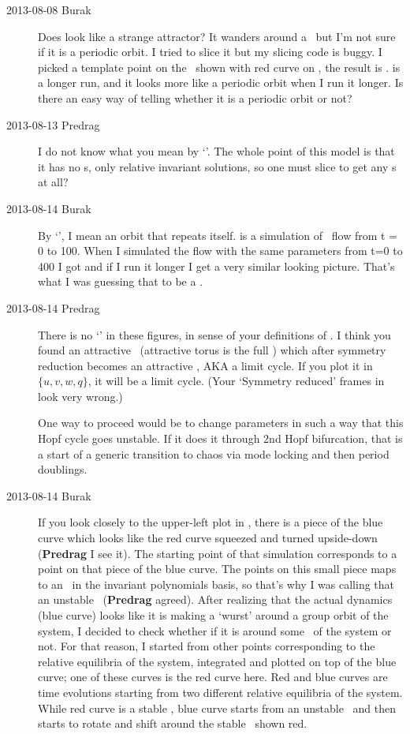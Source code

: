 \begin{description}
\item[2013-08-08  Burak] Does  look like a
strange attractor? It wanders around a \reqv\ but I'm not
sure if it is a periodic orbit. I tried to slice it but my slicing code
is buggy. I picked a template point on the \reqv\ shown
with red curve on , the result is
.  is a longer run,
and it looks more like a periodic orbit when I run it longer. Is there an
easy way of telling whether it is a periodic orbit or not?

\item[2013-08-13 Predrag]
I do not know what you mean by `\po'. The whole point of this model
is that it has no \po s, only relative invariant solutions, so one
must slice to get any \po s at all?

\item[2013-08-14 Burak] By `\po', I mean an orbit that repeats itself.
 is a simulation of \twomode\ flow from t = 0 to
100. When I simulated the flow with the same parameters from t=0 to 400 I
got  and if I run it longer I get a very
similar looking picture. That's what I was guessing that to be a \po.

\item[2013-08-14 Predrag]
There is no `\po' in these figures, in sense of your definitions of
. I think you found an attractive \rpo\
(attractive torus is the full \statesp) which after symmetry reduction
becomes an attractive \po, AKA a limit cycle. If you plot it in
$\{u,v,w,q\}$, it will be a limit cycle. (Your `Symmetry reduced' frames
in \reffig{fig:BBpars3symmred} look very wrong.)

One way to proceed would be to
change parameters in such a way that this Hopf cycle goes unstable. If it
does it through 2nd Hopf bifurcation, that is a start of a generic
transition to chaos via mode locking and then period doublings.

\item[2013-08-14 Burak]
If you look closely to the upper-left plot in ,
there is a piece of the blue curve which looks like the red curve
squeezed and turned upside-down ({\bf Predrag} I see it). The starting
point of that simulation corresponds to a point on that piece of the blue
curve. The points on this small piece maps to an \eqv\ in the invariant
polynomials basis, so that's why I was calling that an unstable \reqv\
({\bf Predrag} agreed). After realizing that the actual dynamics (blue
curve) looks like it is making a `wurst' around a group orbit of the
system, I decided to check whether if it is around some \reqv\ of the
system or not. For that reason, I started from other points corresponding
to the relative equilibria of the system, integrated and plotted on top
of the blue curve; one of these curves is the red curve here. Red and
blue curves are time evolutions starting from two different relative
equilibria of the system. While red curve is a stable \reqv, blue curve
starts from an unstable \reqv\ and then starts to rotate and shift around
the stable \reqv\ shown red.


\end{description}

